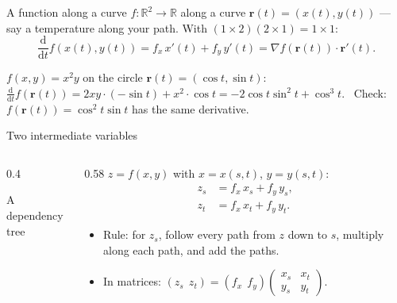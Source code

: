 \documentclass[10pt]{wosm-slides}
\newcommand{\R}{\mathbb{R}}
\newcommand{\vr}{\mathbf{r}}
\begin{document}
\begin{frame}{A function along a curve}
  $f\colon \R^2 \to \R$ along a curve $\vr(t) = (x(t), y(t))$ --- say a temperature along your path.
  With $(1 \times 2)(2 \times 1) = 1 \times 1$:
  \[ \frac{\mathrm d}{\mathrm dt} f(x(t), y(t))
     = f_x\, x'(t) + f_y\, y'(t) = \nabla f(\vr(t)) \cdot \vr'(t) . \]
  \pause
  \begin{example}
    $f(x, y) = x^2 y$ on the circle $\vr(t) = (\cos t, \sin t)$:
    $\frac{\mathrm d}{\mathrm dt} f(\vr(t)) = 2xy \cdot (-\sin t) + x^2 \cdot \cos t
    = -2\cos t \sin^2 t + \cos^3 t$. \ Check: $f(\vr(t)) = \cos^2 t \sin t$ has the same derivative.
  \end{example}
\end{frame}

\begin{frame}{Two intermediate variables}
  \begin{columns}[c]
    \begin{column}{0.4\textwidth}
      \centering
      \par\small A dependency tree
    \end{column}
    \begin{column}{0.58\textwidth}
      $z = f(x, y)$ with $x = x(s, t)$, $y = y(s, t)$:
      \begin{align*}
        z_s &= f_x\, x_s + f_y\, y_s, \\
        z_t &= f_x\, x_t + f_y\, y_t .
      \end{align*}
      \pause
      \small
      \begin{itemize}
        \item Rule: for $z_s$, follow every path from $z$ down to $s$, multiply along each path,
          and add the paths.
        \item In matrices:
          $(z_s \ \ z_t) = (f_x \ \ f_y) \begin{pmatrix} x_s & x_t \\ y_s & y_t \end{pmatrix}$.
      \end{itemize}
    \end{column}
  \end{columns}
\end{frame}
\end{document}
